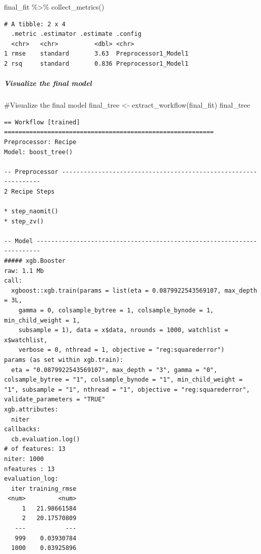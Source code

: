 \documentclass[
]{article}
\let\oldsubparagraph\subparagraph
\renewcommand{\subparagraph}[1]{\oldsubparagraph{#1}\mbox{}}
\newenvironment{Shaded}{\begin{snugshade}}{\end{snugshade}}
\newcommand{\CommentTok}[1]{\textcolor[rgb]{0.37,0.37,0.37}{#1}}
\newcommand{\FunctionTok}[1]{\textcolor[rgb]{0.28,0.35,0.67}{#1}}
\newcommand{\NormalTok}[1]{\textcolor[rgb]{0.00,0.23,0.31}{#1}}
\newcommand{\OtherTok}[1]{\textcolor[rgb]{0.00,0.23,0.31}{#1}}
\newcommand{\SpecialCharTok}[1]{\textcolor[rgb]{0.37,0.37,0.37}{#1}}
\begin{document}
\begin{Shaded}
\begin{Highlighting}[]
\NormalTok{final\_fit }\SpecialCharTok{\%\textgreater{}\%} 
  \FunctionTok{collect\_metrics}\NormalTok{()}
\end{Highlighting}
\end{Shaded}

\begin{verbatim}
# A tibble: 2 x 4
  .metric .estimator .estimate .config             
  <chr>   <chr>          <dbl> <chr>               
1 rmse    standard       3.63  Preprocessor1_Model1
2 rsq     standard       0.836 Preprocessor1_Model1
\end{verbatim}

\hypertarget{visualize-the-final-model-1}{%
\subparagraph{Visualize the final
model}\label{visualize-the-final-model-1}}

\begin{Shaded}
\begin{Highlighting}[]
\CommentTok{\#Visualize the final model}
\NormalTok{final\_tree }\OtherTok{\textless{}{-}} \FunctionTok{extract\_workflow}\NormalTok{(final\_fit)}
\NormalTok{final\_tree}
\end{Highlighting}
\end{Shaded}

\begin{verbatim}
== Workflow [trained] ==========================================================
Preprocessor: Recipe
Model: boost_tree()

-- Preprocessor ----------------------------------------------------------------
2 Recipe Steps

* step_naomit()
* step_zv()

-- Model -----------------------------------------------------------------------
##### xgb.Booster
raw: 1.1 Mb 
call:
  xgboost::xgb.train(params = list(eta = 0.0879922543569107, max_depth = 3L, 
    gamma = 0, colsample_bytree = 1, colsample_bynode = 1, min_child_weight = 1, 
    subsample = 1), data = x$data, nrounds = 1000, watchlist = x$watchlist, 
    verbose = 0, nthread = 1, objective = "reg:squarederror")
params (as set within xgb.train):
  eta = "0.0879922543569107", max_depth = "3", gamma = "0", colsample_bytree = "1", colsample_bynode = "1", min_child_weight = "1", subsample = "1", nthread = "1", objective = "reg:squarederror", validate_parameters = "TRUE"
xgb.attributes:
  niter
callbacks:
  cb.evaluation.log()
# of features: 13 
niter: 1000
nfeatures : 13 
evaluation_log:
  iter training_rmse
 <num>         <num>
     1   21.98661584
     2   20.17570809
   ---           ---
   999    0.03930784
  1000    0.03925896
\end{verbatim}
\end{document}
